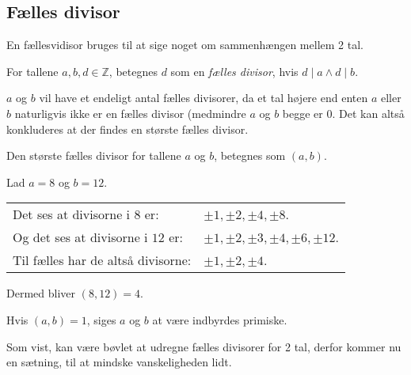 

\subsection{Fælles divisor}
En fællesvidisor bruges til at sige noget om sammenhængen mellem 2 tal.

\begin{definition}
    For tallene \(a, b, d \in \mathbb{Z}\), betegnes \(d\) som en \emph{fælles divisor}, hvis \(d \mid a \land d \mid b\).
\end{definition}

\(a\) og \(b\) vil have et endeligt antal fælles divisorer, da et tal højere end enten \(a\) eller \(b\) naturligvis ikke er en fælles divisor (medmindre \(a\) og \(b\) begge er \(0\).
Det kan altså konkluderes at der findes en største fælles divisor.

\begin{definition}
    Den største fælles divisor for tallene \(a\) og \(b\), betegnes som \((a, b)\).
\end{definition}

\begin{eks}
    Lad \(a = 8\) og \(b = 12\).\\
    \begin{tabular*}{\textwidth}{@{} l l}
        Det ses at divisorne i \(8\) er: & \(\pm 1, \pm 2, \pm 4, \pm 8\).\\
        Og det ses at divisorne i \(12\) er:  &\(\pm 1, \pm 2, \pm 3, \pm 4, \pm 6, \pm 12\).\\
        Til fælles har de altså divisorne: & \(\pm 1, \pm 2, \pm 4\).
    \end{tabular*}

    Dermed bliver \((8, 12) = 4\).
\end{eks}


\begin{definition}
    Hvis \((a, b) = 1\), siges \(a\) og \(b\) at være indbyrdes primiske.
\end{definition}

Som vist, kan være bøvlet at udregne fælles divisorer for 2 tal, derfor kommer nu en sætning, til at mindske vanskeligheden lidt.

